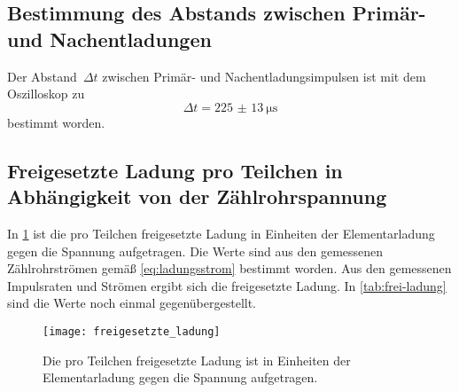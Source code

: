\subsection{Bestimmung des Abstands zwischen Primär- und
  Nachentladungen}

Der Abstand~$\Delta t$ zwischen Primär- und Nachentladungsimpulsen ist mit dem
Oszilloskop zu
%
\begin{equation}
  \Delta t = \SI{225(13)}{\micro\second}
\end{equation}
%
bestimmt worden.

\subsection{Freigesetzte Ladung pro Teilchen in Abhängigkeit von der
  Zählrohrspannung}

In \cref{fig:freigesetzte_ladung} ist die pro Teilchen freigesetzte
Ladung in Einheiten der Elementarladung gegen die Spannung aufgetragen.
Die Werte sind aus den gemessenen Zählrohrströmen gemäß
\cref{eq:ladungsstrom} bestimmt worden. Aus den gemessenen Impulsraten
und Strömen ergibt sich die freigesetzte Ladung. In
\cref{tab:frei-ladung} sind die Werte noch einmal gegenübergestellt.

\begin{figure}
  \centering
  \texttt{[image: freigesetzte\_ladung]}
    \caption{Die pro Teilchen freigesetzte Ladung ist in Einheiten der
      Elementarladung gegen die Spannung aufgetragen.}
  \label{fig:freigesetzte_ladung}
\end{figure}


